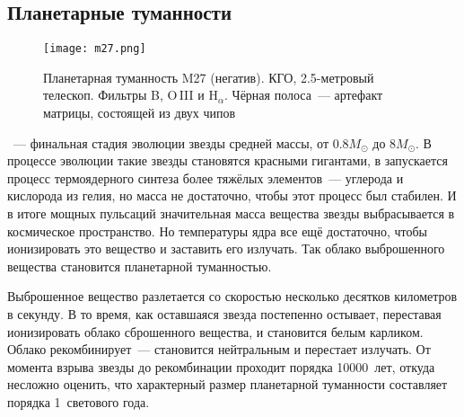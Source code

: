 \subsection{Планетарные туманности}

\begin{wrapfigure}[15]{r}{0.3\tw}
    \vspace{-1pc}
    \centering
    \texttt{[image: m27.png]}
    \caption{Пла\-не\-тар\-ная туманность M27 (негатив). КГО, 2.5-метровый телескоп. Фильтры B, O\,III и $\text{H}_\alpha$. Чёрная полоса~--- артефакт матрицы, состоящей из двух чипов}
\end{wrapfigure}
~--- финальная стадия эволюции звезды средней массы, от $0.8M_\odot$ до $8M_\odot$. В процессе эволюции такие звезды становятся красными гигантами, в запускается процесс термоядерного синтеза более тяжёлых элементов~--- углерода и кислорода из гелия, но масса не достаточно, чтобы этот процесс был стабилен. И в итоге мощных пульсаций значительная масса вещества звезды выбрасывается в космическое пространство.  Но температуры ядра все ещё достаточно, чтобы ионизировать это вещество и заставить его излучать. Так облако выброшенного вещества становится планетарной туманностью.

Выброшенное вещество разлетается со скоростью несколько десятков километров в секунду. В то время, как оставшаяся звезда постепенно остывает, переставая ионизировать облако сброшенного вещества, и становится белым карликом. Облако рекомбинирует~--- становится нейтральным и перестает излучать. От момента взрыва звезды до рекомбинации проходит порядка 10000~лет, откуда несложно оценить, что характерный размер планетарной туманности составляет порядка 1~светового года.
 
